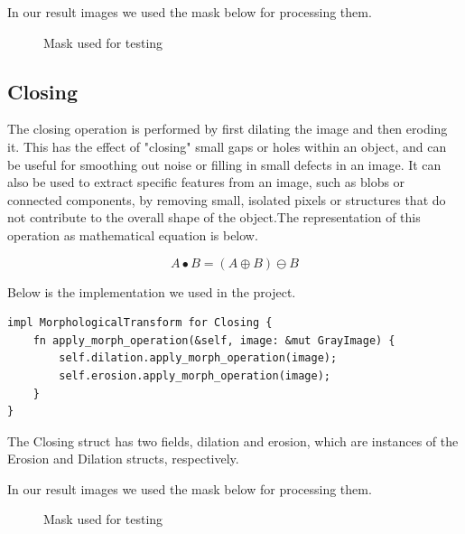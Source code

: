 \documentclass[12pt]{article}
\begin{document}
In our result images we used the mask below for processing them.
\begin{figure}[H]\centering
    \begin{subfigure}[t]{.2\textwidth}\centering
    \end{subfigure}
    \caption{Mask used for testing}
\end{figure}

\subsection{Closing}

The closing operation is performed by first dilating the image and then eroding it. This has the effect of "closing" small gaps or holes within an object, and can be useful for smoothing out noise or filling in small defects in an image. It can also be used to extract specific features from an image, such as blobs or connected components, by removing small, isolated pixels or structures that do not contribute to the overall shape of the object.The representation of this operation as mathematical equation is below.

\begin{equation}
   A \bullet B  = ( A \oplus B )\ominus B
\end{equation}

Below is the implementation we used in the project.
\begin{lstlisting}
impl MorphologicalTransform for Closing {
    fn apply_morph_operation(&self, image: &mut GrayImage) {
    	self.dilation.apply_morph_operation(image);
        self.erosion.apply_morph_operation(image);
    }
}
\end{lstlisting}

The Closing struct has two fields, dilation and erosion, which are instances of the Erosion and Dilation structs, respectively.

In our result images we used the mask below for processing them.
\begin{figure}[H]\centering
    \begin{subfigure}[t]{.2\textwidth}\centering
    \end{subfigure}
    \caption{Mask used for testing}
\end{figure}
\end{document}
